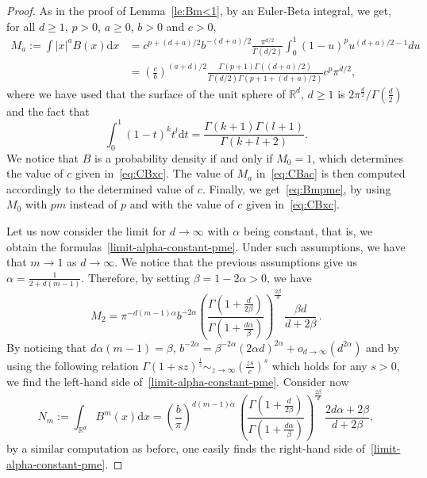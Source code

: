 \documentclass[10pt,reqno]{amsart}
\numberwithin{equation}{section}
\begin{document}
\begin{proof}
As in the proof of Lemma~\ref{le:Bm<1}, by an Euler-Beta integral, we get, for all $d\ge1$, $p>0$, $a\ge0$, $b>0$ and $c>0$,
\begin{align}\label{eq:Baporous}
M_a:=\int{|x|^aB(x)\mathrm{d}x} &= c^{p + (d+a)/2}b^{-(d+a)/2}\frac{\pi^{d/2}}{\Gamma(d/2)}\int_0^1{(1-u)^p u^{(d+a)/2 - 1}du} \nonumber \\
&= \left(\frac{c}{b}\right)^{(a+d)/2}\frac{\Gamma(p+1)\Gamma((d+a)/2)}{\Gamma(d/2)\Gamma(p+1 + (d+a)/2)}c^p\pi^{d/2},
\end{align}
where we have used that the surface of the unit sphere of $\mathbb{R}^d$, $d\ge1$ is $2\pi^\frac{d}{2}/\Gamma(\frac{d}{2})$ and the fact that 
\[
\int_0^1 (1-t)^kt^l\mathrm{d}t=\frac{\Gamma(k+1)\Gamma(l+1)}{\Gamma(k+l+2)}.
\]
We notice that $B$ is a probability density if and only if $M_0=1$, which determines the value of $c$ given in~\eqref{eq:CBxc}. The value of $M_a$ in~\eqref{eq:CBac} is then computed accordingly to the determined value of $c$. Finally, we get~\eqref{eq:Bmpme}, by using $M_0$ with $pm$ instead of $p$ and with the value of $c$ given in~\eqref{eq:CBxc}.

Let us now consider the limit for $d\rightarrow\infty$ with $\alpha$ being constant, that is, we obtain the formulas~\eqref{limit-alpha-constant-pme}. Under such assumptions, we have that $m\to1$ as $d\to\infty$. We notice that the previous assumptions give us $\alpha=\frac{1}{2+d(m-1)}$. Therefore, by setting $\beta=1-2\alpha>0$, we have
\begin{equation}\label{m2-pme}    M_2 = \pi^{-d(m-1)\alpha} b^{-2\alpha} \left(\frac{\Gamma(1+\frac{d}{2\beta})}{\Gamma(1+\frac{d\alpha}{\beta})}\right)^{\frac{2\beta}{d}}\, \frac{\beta d}{d+2\beta}\,.
\end{equation}
By noticing that $d\alpha(m-1)=\beta$, $b^{-2\alpha}=\beta^{-2\alpha}(2\alpha d)^{2\alpha}+o_{d\rightarrow\infty}(d^{2\alpha})$ and
by using the following relation $\Gamma(1+sz)^\frac{1}{z}\sim_{z\rightarrow\infty} (\frac{zs}{e})^s$ which holds for any $s>0$, we find the left-hand side of~\eqref{limit-alpha-constant-pme}. Consider now
\begin{equation}\label{nm-pme}
N_m:=\int_{\mathbb{R}^d}B^m(x)\mathrm{d}x = \left(\frac{b}{\pi}\right)^{d(m-1)\alpha} \,\left(\frac{\Gamma(1+\frac{d}{2\beta})}{\Gamma(1+\frac{d\alpha}{\beta})}\right)^{\frac{2\beta}{d}}\,\frac{2d\alpha+2\beta}{d+2\beta} , 
\end{equation}
by a similar computation as before, one easily finds the right-hand side of~\eqref{limit-alpha-constant-pme}.


\end{proof}
\end{document}
